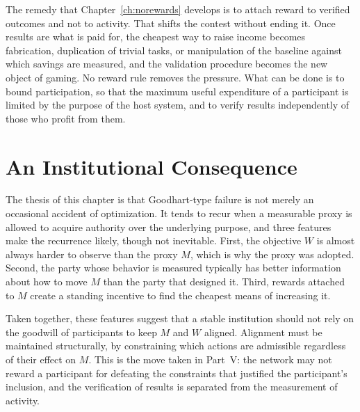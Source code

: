 The remedy that Chapter~\ref{ch:norewards} develops is to attach reward to verified outcomes and not to activity. That shifts the contest without ending it. Once results are what is paid for, the cheapest way to raise income becomes fabrication, duplication of trivial tasks, or manipulation of the baseline against which savings are measured, and the validation procedure becomes the new object of gaming. No reward rule removes the pressure. What can be done is to bound participation, so that the maximum useful expenditure of a participant is limited by the purpose of the host system, and to verify results independently of those who profit from them.

\section{An Institutional Consequence}

The thesis of this chapter is that Goodhart-type failure is not merely an occasional accident of optimization. It tends to recur when a measurable proxy is allowed to acquire authority over the underlying purpose, and three features make the recurrence likely, though not inevitable. First, the objective $W$ is almost always harder to observe than the proxy $M$, which is why the proxy was adopted. Second, the party whose behavior is measured typically has better information about how to move $M$ than the party that designed it. Third, rewards attached to $M$ create a standing incentive to find the cheapest means of increasing it.

Taken together, these features suggest that a stable institution should not rely on the goodwill of participants to keep $M$ and $W$ aligned. Alignment must be maintained structurally, by constraining which actions are admissible regardless of their effect on $M$. This is the move taken in Part~V: the network may not reward a participant for defeating the constraints that justified the participant's inclusion, and the verification of results is separated from the measurement of activity.

